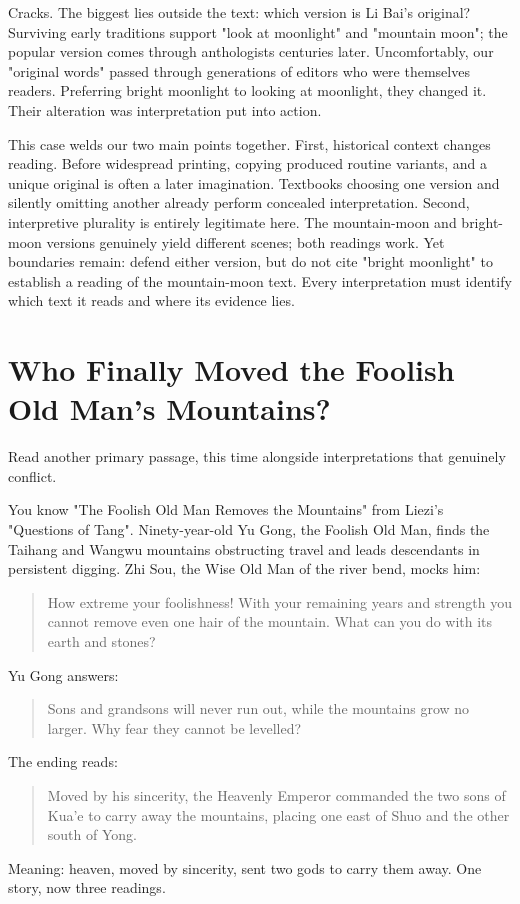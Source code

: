 Cracks. The biggest lies outside the text: which version is Li Bai's original? Surviving early traditions support "look at moonlight" and "mountain moon"; the popular version comes through anthologists centuries later. Uncomfortably, our "original words" passed through generations of editors who were themselves readers. Preferring bright moonlight to looking at moonlight, they changed it. Their alteration was interpretation put into action.

This case welds our two main points together. First, historical context changes reading. Before widespread printing, copying produced routine variants, and a unique original is often a later imagination. Textbooks choosing one version and silently omitting another already perform concealed interpretation. Second, interpretive plurality is entirely legitimate here. The mountain-moon and bright-moon versions genuinely yield different scenes; both readings work. Yet boundaries remain: defend either version, but do not cite "bright moonlight" to establish a reading of the mountain-moon text. Every interpretation must identify which text it reads and where its evidence lies.

\section[Who Finally Moved Yu Gong's Mountains?]{Who Finally Moved the Foolish Old Man's Mountains?}
Read another primary passage, this time alongside interpretations that genuinely conflict.

You know "The Foolish Old Man Removes the Mountains" from Liezi's "Questions of Tang". Ninety-year-old Yu Gong, the Foolish Old Man, finds the Taihang and Wangwu mountains obstructing travel and leads descendants in persistent digging. Zhi Sou, the Wise Old Man of the river bend, mocks him:

\begin{quote}
How extreme your foolishness! With your remaining years and strength you cannot remove even one hair of the mountain. What can you do with its earth and stones?
\end{quote}
Yu Gong answers:

\begin{quote}
Sons and grandsons will never run out, while the mountains grow no larger. Why fear they cannot be levelled?
\end{quote}
The ending reads:

\begin{quote}
Moved by his sincerity, the Heavenly Emperor commanded the two sons of Kua'e to carry away the mountains, placing one east of Shuo and the other south of Yong.
\end{quote}
Meaning: heaven, moved by sincerity, sent two gods to carry them away. One story, now three readings.

